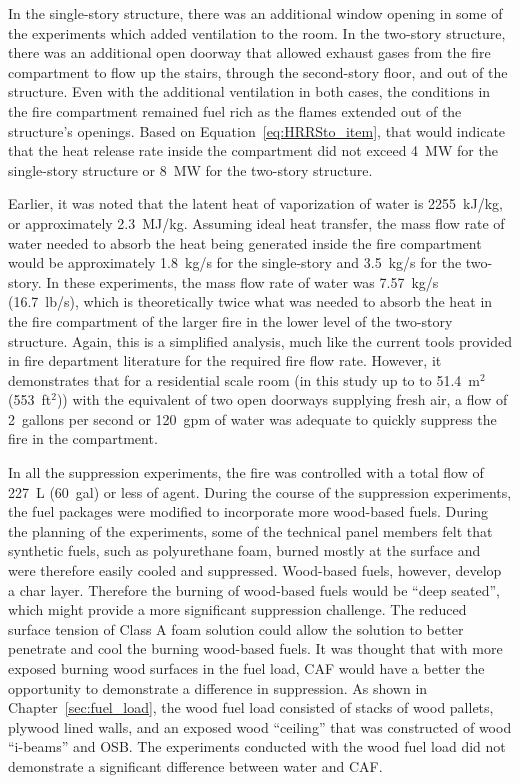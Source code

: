 \documentclass[12pt,oneside]{book}
\begin{document}
In the single-story structure, there was an additional window opening in some of the experiments which added ventilation to the room. In the two-story structure, there was an additional open doorway that allowed exhaust gases from the fire compartment to flow up the stairs, through the second-story floor, and out of the structure. Even with the additional ventilation in both cases, the conditions in the fire compartment remained fuel rich as the flames extended out of the structure's openings. Based on Equation~\ref{eq:HRRSto_item}, that would indicate that the heat release rate inside the compartment did not exceed 4~MW for the single-story structure or 8~MW for the two-story structure. 

Earlier, it was noted that the latent heat of vaporization of water is 2255~kJ/kg, or approximately 2.3~MJ/kg. Assuming ideal heat transfer, the mass flow rate of water needed to absorb the heat being generated inside the fire compartment would be approximately 1.8~kg/s for the single-story and 3.5~kg/s for the two-story. In these experiments, the mass flow rate of water was 7.57~kg/s (16.7~lb/s), which is theoretically twice what was needed to absorb the heat in the fire compartment of the larger fire in the lower level of the two-story structure. Again, this is a simplified analysis, much like the current tools provided in fire department literature for the required fire flow rate. However, it demonstrates that for a residential scale room (in this study up to to 51.4~m$^2$ (553~ft$^2$)) with the equivalent of two open doorways supplying fresh air, a flow of 2~gallons per second or 120~gpm of water was adequate to quickly suppress the fire in the compartment.                

In all the suppression experiments, the fire was controlled with a total flow of 227~L (60~gal) or less of agent. During the course of the suppression experiments, the fuel packages were modified to incorporate more wood-based fuels. During the planning of the experiments, some of the technical panel members felt that synthetic fuels, such as polyurethane foam, burned mostly at the surface and were therefore easily cooled and suppressed. Wood-based fuels, however, develop a char layer. Therefore the burning of wood-based fuels would be ``deep seated'', which might provide a more significant suppression challenge. The reduced surface tension of Class A foam solution could allow the solution to better penetrate and cool the burning wood-based fuels. It was thought that with more exposed burning wood surfaces in the fuel load, CAF would have a better the opportunity to demonstrate a difference in suppression. As shown in Chapter~\ref{sec:fuel_load}, the wood fuel load consisted of stacks of wood pallets, plywood lined walls, and an exposed wood ``ceiling'' that was constructed of wood ``i-beams'' and OSB. The experiments conducted with the wood fuel load did not demonstrate a significant difference between water and CAF.  
\end{document}
